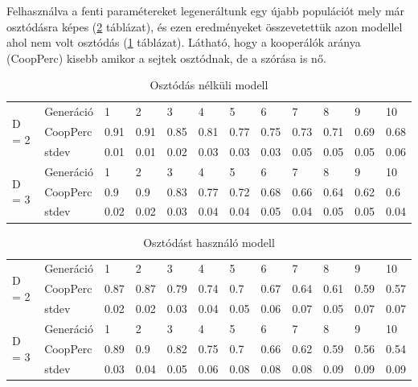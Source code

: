 Felhasználva a fenti paramétereket legeneráltunk egy újabb populációt mely már osztódásra képes (\ref{table:osztodik} táblázat), és ezen eredményeket összevetettük azon modellel ahol nem volt osztódás (\ref{table:nemOsztodik} táblázat). Látható, hogy a kooperálók aránya (CoopPerc) kisebb amikor a sejtek osztódnak, de a szórása is nő.

\begin{table}[htb]
	\caption{Osztódás nélküli modell \label{table:nemOsztodik}}
	\begin{tabular}{ | l | l | l | l | l | l | l | l | l | l | l | l | }
		\hline
		\multirow{3}{*}{D = 2}
		& Generáció & 1 & 2 & 3 & 4 & 5 & 6 & 7 & 8 & 9 & 10 \\ \cline{2-12}
		& CoopPerc & 0.91 & 0.91 & 0.85 & 0.81 & 0.77 & 0.75 & 0.73 & 0.71 & 0.69 & 0.68 \\ \cline{2-12}
		& stdev & 0.01 & 0.01 & 0.02 & 0.03 & 0.03 & 0.03 & 0.05 & 0.05 & 0.05 & 0.06 \\ \hline
		\multirow{3}{*}{D = 3}
		& Generáció & 1 & 2 & 3 & 4 & 5 & 6 & 7 & 8 & 9 & 10 \\ \cline{2-12}
		& CoopPerc & 0.9 & 0.9 & 0.83 & 0.77 & 0.72 & 0.68 & 0.66 & 0.64 & 0.62 & 0.6 \\ \cline{2-12}
		& stdev & 0.02 & 0.02 & 0.03 & 0.04 & 0.04 & 0.05 & 0.04 & 0.05 & 0.05 & 0.04 \\ \hline
	\end{tabular}
\end{table}

\begin{table}[htb]
	\caption{Osztódást használó modell}
	\label{table:osztodik}
	\begin{tabular}{ | l | l | l | l | l | l | l | l | l | l | l | l | }
		\hline
		\multirow{3}{*}{D = 2}
		& Generáció & 1 & 2 & 3 & 4 & 5 & 6 & 7 & 8 & 9 & 10 \\ \cline{2-12}
		& CoopPerc & 0.87 & 0.87 & 0.79 & 0.74 & 0.7 & 0.67 & 0.64 & 0.61 & 0.59 & 0.57 \\ \cline{2-12}
		& stdev & 0.02 & 0.02 & 0.03 & 0.04 & 0.05 & 0.06 & 0.07 & 0.05 & 0.07 & 0.07 \\ \hline
		\multirow{3}{*}{D = 3}
		& Generáció & 1 & 2 & 3 & 4 & 5 & 6 & 7 & 8 & 9 & 10 \\ \cline{2-12}
		& CoopPerc & 0.89 & 0.9 & 0.82 & 0.75 & 0.7 & 0.66 & 0.62 & 0.59 & 0.56 & 0.54 \\ \cline{2-12}
		& stdev & 0.03 & 0.04 & 0.05 & 0.06 & 0.08 & 0.08 & 0.08 & 0.09 & 0.09 & 0.09 \\ \hline
	\end{tabular}
\end{table}
